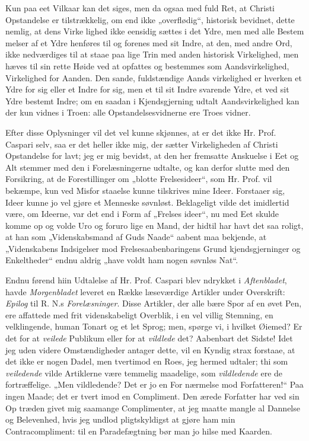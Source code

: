 \documentclass[12pt]{book}
\newcommand{\opage}[1]{\marginnote{\footnotesize\textit{[#1]}}}
\begin{document}
Kun paa eet Vilkaar kan det siges, men da ogsaa med
fuld Ret, at Christi Opstandelse er tilstrækkelig, om end ikke
„overflødig“, historisk bevidnet, dette nemlig, at dens Virke\-%
lighed ikke eensidig sættes i det Ydre, men med alle Bestem\-%
melser af et Ydre henføres til og forenes med sit Indre, at
den, med andre Ord, ikke nedværdiges til at staae paa lige
\opage{310}\setcounter{footnote}{0}%
Trin med anden historisk Virkelighed, men hæves til sin rette
Høide ved at opfattes og bestemmes som Aandsvirkelighed,
Virkelighed for Aanden. Den sande, fuldstændige Aands\-%
virkelighed er hverken et Ydre for sig eller et Indre for sig, men
et til sit Indre svarende Ydre, et ved sit Ydre bestemt Indre;
om en saadan i Kjendsgjerning udtalt Aandsvirkelighed kan
der kun vidnes i Troen: alle Opstandelsesvidnerne ere Troes\-%
vidner.

Efter disse Oplysninger vil det vel kunne skjønnes, at
er det ikke Hr. Prof. Caspari selv, saa er det heller ikke mig,
der sætter Virkeligheden af Christi Opstandelse for lavt; jeg
er mig bevidst, at den her fremsatte Anskuelse i Eet og Alt
stemmer med den i Forelæsningerne udtalte, og kan derfor
slutte med den Forsikring, at de Forestillinger om „blotte
Frelsesideer“, som Hr. Prof. vil bekæmpe, kun ved Misfor\-%
staaelse kunne tilskrives mine Ideer. Forstaaer sig, Ideer
kunne jo vel gjøre et Menneske søvnløst. Beklageligt vilde det
imidlertid være, om Ideerne, var det end i Form af „Frelses\-%
ideer“, nu med Eet skulde komme op og volde Uro og foruro\-%
lige en Mand, der hidtil har havt det saa roligt, at han som
„Videnskabsmand af Guds Naade“ aabent maa bekjende, at
„Videnskabens Indsigelser mod Frelsesaabenbaringens Grund\-%
kjendsgjerninger og Enkeltheder“ endnu aldrig „have voldt
ham nogen søvnløs Nat“.

Endnu førend hiin Udtalelse af Hr. Prof. Caspari blev
ndrykket i \emph{Aftenbladet}, havde \emph{Morgenbladet} leveret en
Række læseværdige Artikler under Overskrift: \emph{Epilog} til R. N.s
\emph{Forelæsninger}. Disse Artikler, der alle bære Spor af en øvet
Pen, ere affattede med frit videnskabeligt Overblik, i en vel\-%
villig Stemning, en velklingende, human Tonart og et let Sprog;
men, spørge vi, i hvilket Øiemed? Er det for at \emph{veilede}
Publikum eller for at \emph{vildlede} det? Aabenbart det Sidste!
Idet jeg uden videre Omstændigheder antager dette, vil en
Kyndig strax forstaae, at det ikke er nogen Dadel, men
\opage{311}\setcounter{footnote}{0}%
tvertimod en Roes, jeg hermed udtaler; thi som \emph{veiledende}
vilde Artiklerne være temmelig maadelige, som \emph{vildledende}
ere de fortræffelige. „Men vildledende? Det er jo en For\-%
nærmelse mod Forfatteren!“ Paa ingen Maade; det er tvert\-%
imod en Compliment. Den ærede Forfatter har ved sin Op\-%
træden givet mig saamange Complimenter, at jeg maatte mangle
al Dannelse og Belevenhed, hvis jeg undlod pligtskyldigst at
gjøre ham min Contracompliment: til en Paradefægtning bør
man jo hilse med Kaarden.
\end{document}
